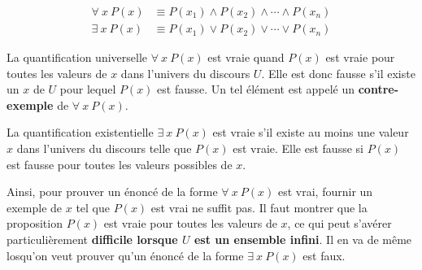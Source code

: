 \documentclass[
  letterpaper,
]{scrbook}
\theoremstyle{definition}
\theoremstyle{definition}
\theoremstyle{plain}
\theoremstyle{remark}
\begin{document}
\begin{align*}
\forall\ x\ P(x) &\equiv P(x_1)\wedge P(x_2) \wedge \cdots \wedge P(x_n) \\
\exists\ x\ P(x) &\equiv P(x_1)\vee P(x_2) \vee \cdots \vee P(x_n)
\end{align*}

La quantification universelle \(\forall\ x\ P(x)\) est vraie quand
\(P(x)\) est vraie pour toutes les valeurs de \(x\) dans l'univers du
discours \(U\). Elle est donc fausse s'il existe un \(x\) de \(U\) pour
lequel \(P(x)\) est fausse. Un tel élément est appelé un
\textbf{contre-exemple} de \(\forall\ x\ P(x)\).

La quantification existentielle \(\exists\ x\ P(x)\) est vraie s'il
existe au moins une valeur \(x\) dans l'univers du discours telle que
\(P(x)\) est vraie. Elle est fausse si \(P(x)\) est fausse pour toutes
les valeurs possibles de \(x\).

Ainsi, pour prouver un énoncé de la forme \(\forall\ x\ P(x)\) est vrai,
fournir un exemple de \(x\) tel que \(P(x)\) est vrai ne suffit pas. Il
faut montrer que la proposition \(P(x)\) est vraie pour toutes les
valeurs de \(x\), ce qui peut s'avérer particulièrement
\textbf{difficile lorsque \(U\) est un ensemble infini}. Il en va de
même losqu'on veut prouver qu'un énoncé de la forme \(\exists\ x\ P(x)\)
est faux.
\end{document}
